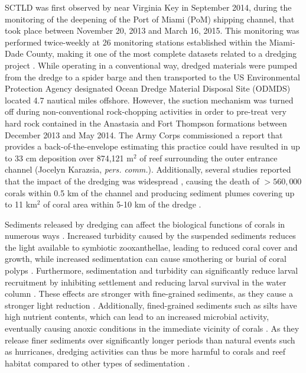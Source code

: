 \documentclass[preprint,12pt,authoryear]{elsarticle}
\begin{document}
SCTLD was first observed by \cite{precht2016unprecedented} near Virginia Key in September 2014, during the monitoring of the deepening of the Port of Miami (PoM) shipping channel, that took place between November 20, 2013 and March 16, 2015. This monitoring was performed twice-weekly at 26 monitoring stations established within the Miami-Dade County, making it one of the most complete datasets related to a dredging project \citep{gintert2019regional}. While operating in a conventional way, dredged materials were pumped from the dredge to a spider barge and then transported to the US Environmental Protection Agency designated Ocean Dredge Material Disposal Site (ODMDS) located 4.7 nautical miles offshore. However, the suction mechanism was turned off during non-conventional rock-chopping activities in order to pre-treat very hard rock contained in the Anastasia and Fort Thompson formations between December 2013 and May 2014. The Army Corps commissioned a report that provides a back-of-the-envelope estimating this practice could have resulted in up to 33 cm deposition over 874,121 m$^2$ of reef surrounding the outer entrance channel (Jocelyn Karazsia, \textit{pers. comm.}). Additionally, several studies reported that the impact of the dredging was widespread \citep{miller2016detecting}, causing the death of  $> 560,000$ corals within 0.5 km of the channel \citep{cunning2019extensive} and producing sediment plumes covering up to 11 km$^2$ of coral area within 5-10 km of the dredge \citep{barnes2015sediment}.

Sediments released by dredging can affect the biological functions of corals in numerous ways \citep{erftemeijer2012environmental, jones2015effects}. Increased turbidity caused by the suspended sediments reduces the light available to symbiotic zooxanthellae, leading to reduced coral cover and growth, while increased sedimentation can cause smothering or burial of coral polyps \citep{erftemeijer2012environmental}. Furthermore, sedimentation and turbidity can significantly reduce larval recruitment by inhibiting settlement and reducing larval survival in the water column \citep{jones2015effects}. These effects are stronger with fine-grained sediments, as they cause a stronger light reduction \citep{fourney2017additive}. Additionally, fined-grained sediments such as silts have high nutrient contents, which can lead to an increased microbial activity, eventually causing anoxic conditions in the immediate vicinity of corals \citep{weber2012mechanisms}. As they release finer sediments over significantly longer periods than natural events such as hurricanes, dredging activities can thus be more harmful to corals and reef habitat compared to other types of sedimentation \citep{cunning2019extensive}.
\end{document}
